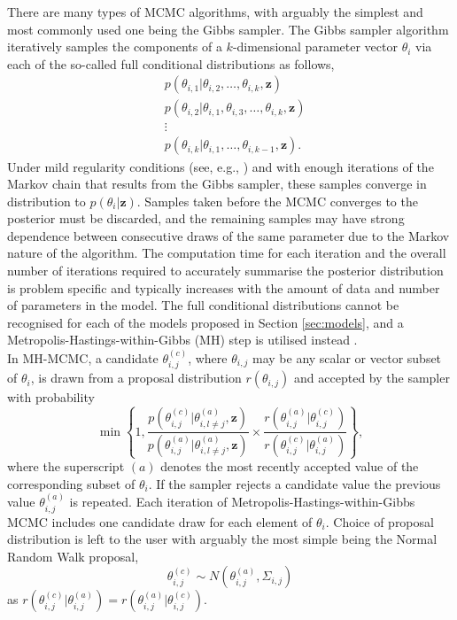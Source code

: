 \documentclass[12pt,a4paper]{article}\usepackage[]{graphicx}\usepackage[]{color}
\begin{document}
There are many types of MCMC algorithms, with arguably the simplest and most commonly used one being the Gibbs sampler. The Gibbs sampler algorithm iteratively samples the components of a $k$-dimensional parameter vector $\theta_i$ via each of the so-called full conditional distributions as follows,
\begin{align}
&p(\theta_{i, 1} | \theta_{i, 2}, \dots, \theta_{i, k}, \textbf{z}) \nonumber \\
&p(\theta_{i, 2} | \theta_{i, 1}, \theta_{i, 3}, \dots, \theta_{i, k}, \textbf{z}) \nonumber \\
&\vdots \nonumber \\
&p(\theta_{i, k} | \theta_{i, 1}, \dots, \theta_{i, k-1}, \textbf{z}). \nonumber
\end{align}
Under mild regularity conditions (see, e.g., \citet{Tierney1994}) and with enough iterations of the Markov chain that results from the Gibbs sampler, these samples converge in distribution to $p(\theta_i | \textbf{z})$. Samples taken before the MCMC converges to the posterior must be discarded, and the remaining samples may have strong dependence between consecutive draws of the same parameter due to the Markov nature of the algorithm. The computation time for each iteration and the overall number of iterations required to accurately summarise the posterior distribution is problem specific and typically increases with the amount of data and number of parameters in the model. The full conditional distributions cannot be recognised for each of the models proposed in Section \ref{sec:models}, and a Metropolis-Hastings-within-Gibbs (MH) step is utilised instead \citep{Gilks1995}.
\\

In MH-MCMC, a candidate $\theta_{i, j}^{(c)}$, where $\theta_{i, j}$ may be any scalar or vector subset of $\theta_i$, is drawn from a proposal distribution $r(\theta_{i, j})$ and accepted by the sampler with probability
\begin{equation}
\min \left\{ 1, \frac{p(\theta_{i, j}^{(c)} | \theta_{i, l \neq j}^{(a)}, \textbf{z})}{p(\theta_{i, j}^{(a)} | \theta_{i, l \neq j}^{(a)}, \textbf{z})} \times \frac{r(\theta_{i, j}^{(a)} | \theta_{i, j}^{(c)})}{r(\theta_{i, j}^{(c)} | \theta_{i, j}^{(a)})} \right\},
\label{MHaccept}
\end{equation}
where the superscript $(a)$ denotes the most recently accepted value of the corresponding subset of $\theta_i$. If the sampler rejects a candidate value the previous value $\theta_{i, j}^{(a)}$ is repeated. Each iteration of Metropolis-Hastings-within-Gibbs MCMC includes one candidate draw for each element of $\theta_i$. Choice of proposal distribution is left to the user with arguably the most simple being the Normal Random Walk proposal,
\begin{equation}
\theta_{i, j}^{(c)} \sim N(\theta_{i, j}^{(a)}, \Sigma_{i, j})
\label{RWprop}
\end{equation}
as $r(\theta_{i, j}^{(c)} | \theta_{i, j}^{(a)}) = r(\theta_{i, j}^{(a)} | \theta_{i, j}^{(c)})$.
\\
\end{document}
